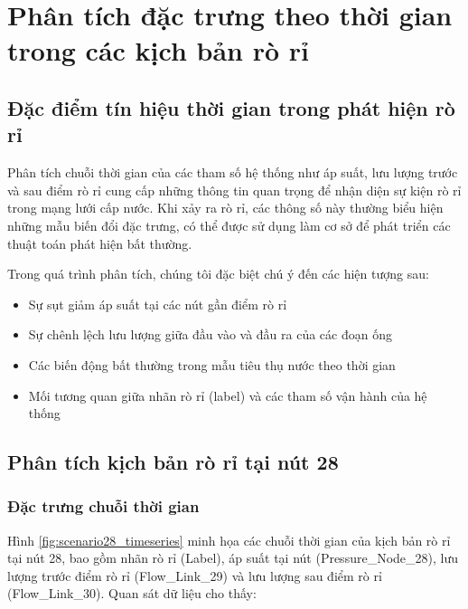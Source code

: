\section{Phân tích đặc trưng theo thời gian trong các kịch bản rò rỉ}

\subsection{Đặc điểm tín hiệu thời gian trong phát hiện rò rỉ}

Phân tích chuỗi thời gian của các tham số hệ thống như áp suất, lưu lượng trước và sau điểm rò rỉ cung cấp những thông tin quan trọng để nhận diện sự kiện rò rỉ trong mạng lưới cấp nước. Khi xảy ra rò rỉ, các thông số này thường biểu hiện những mẫu biến đổi đặc trưng, có thể được sử dụng làm cơ sở để phát triển các thuật toán phát hiện bất thường.

Trong quá trình phân tích, chúng tôi đặc biệt chú ý đến các hiện tượng sau:
\begin{itemize}
    \item Sự sụt giảm áp suất tại các nút gần điểm rò rỉ
    \item Sự chênh lệch lưu lượng giữa đầu vào và đầu ra của các đoạn ống
    \item Các biến động bất thường trong mẫu tiêu thụ nước theo thời gian
    \item Mối tương quan giữa nhãn rò rỉ (label) và các tham số vận hành của hệ thống
\end{itemize}

\subsection{Phân tích kịch bản rò rỉ tại nút 28}

\subsubsection{Đặc trưng chuỗi thời gian}

Hình \ref{fig:scenario28_timeseries} minh họa các chuỗi thời gian của kịch bản rò rỉ tại nút 28, bao gồm nhãn rò rỉ (Label), áp suất tại nút (Pressure\_Node\_28), lưu lượng trước điểm rò rỉ (Flow\_Link\_29) và lưu lượng sau điểm rò rỉ (Flow\_Link\_30). Quan sát dữ liệu cho thấy:

